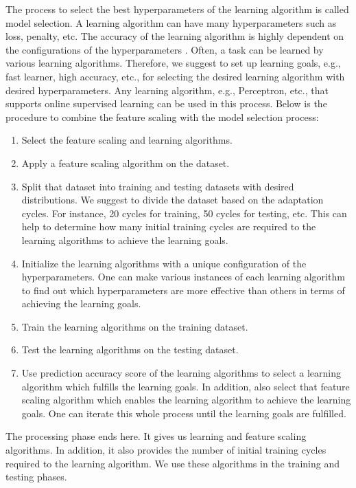 \documentclass[a4paper,12pt]{article}
\begin{document}
The process to select the best hyperparameters of the learning algorithm is called model selection. A learning algorithm can have many hyperparameters such as loss, penalty, etc. The accuracy of the learning algorithm is highly dependent on the configurations of the hyperparameters \cite{LSLMLIP-2013}. Often, a task can be learned by various learning algorithms. Therefore, we suggest to set up learning goals, e.g., fast learner, high accuracy, etc., for selecting the desired learning algorithm with desired hyperparameters. Any learning algorithm, e.g., Perceptron, etc., that supports online supervised learning can be used in this process. Below is the procedure to combine the feature scaling with the model selection process:
\begin{enumerate}
	\item Select the feature scaling and learning algorithms.
	\item Apply a feature scaling algorithm on the dataset.
	\item Split that dataset into training and testing datasets with desired distributions. We suggest to divide the dataset based on the adaptation cycles. For instance, 20 cycles for training, 50 cycles for testing, etc. This can help to determine how many initial training cycles are required to the learning algorithms to achieve the learning goals.
	\item Initialize the learning algorithms with a unique configuration of the hyperparameters. One can make various instances of each learning algorithm to find out which hyperparameters are more effective than others in terms of achieving the learning goals.
	\item Train the learning algorithms on the training dataset.
	\item Test the learning algorithms on the testing dataset.
	\item Use prediction accuracy score of the learning algorithms to select a learning algorithm which fulfills the learning goals. In addition, also select that feature scaling algorithm which enables the learning algorithm to achieve the learning goals. One can iterate this whole process until the learning goals are fulfilled. 
\end{enumerate}
The processing phase ends here. It gives us learning and feature scaling algorithms. In addition, it also provides the number of initial training cycles required to the learning algorithm. We use these algorithms in the training and testing phases.
\end{document}
